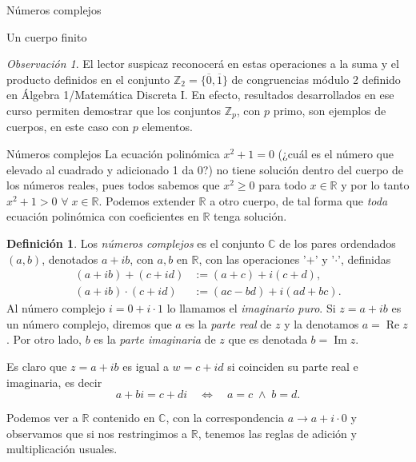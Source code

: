 \documentclass[a4paper,12pt,twoside,spanish,reqno]{amsbook}
\theoremstyle{definition}
\newtheorem{definicion}{Definici\'on}[section]
\theoremstyle{remark}
\newtheorem{obs}{Observaci\'on}[section]
\newcommand{\R}{\mathbb R}
\newcommand{\C}{\mathbb C}
\newcommand{\Z}{\mathbb Z}
\begin{document}
\begin{chapter}{Números complejos}
\begin{subsection}{Un cuerpo finito}
		\begin{obs}
			El lector suspicaz reconocerá en estas operaciones a la suma y el producto definidos en el conjunto $\Z_2=\{\overline{0},\overline{1}\}$ de congruencias módulo 2  definido en Álgebra 1/Matemática Discreta I. En efecto, resultados desarrollados en ese curso permiten demostrar que los conjuntos $\Z_p$, con $p$ primo, son ejemplos de cuerpos, en este caso con $p$ elementos.
		\end{obs}
		
	\end{subsection}
	
	
	\begin{section}{Números complejos}
		La ecuación polinómica $x^2 + 1 =0$ (¿cuál es el número que elevado  al cuadrado y adicionado 1 da 0?) no tiene solución dentro del cuerpo de los números reales,  pues todos sabemos que  $x^2 \ge 0$ para todo $x \in \R$ y por lo tanto $x^2 + 1 >0$ $\forall\; x \in \R$. Podemos extender $\R$ a otro cuerpo,  de tal forma que \textit{toda} ecuación polinómica con coeficientes en $\R$ tenga solución. 
		
		\begin{definicion} 
			Los \textit{números complejos} es el conjunto $\C$  de los pares ordendados $(a,b)$,  denotados $a+ib$, con $a, b$  en $\R$, con las operaciones '$+$' y '$\cdot$', definidas
			\begin{align}
			(a+ib)+ (c+id) &:= (a+c) + i(c+d), \label{sumacompleja} \\
			(a+ib) \cdot (c+id) &:= (ac -bd) + i(ad+bc). \label{productocomplejo}
			\end{align}
			Al número complejo $i = 0 + i\cdot 1$ lo llamamos el \textit{imaginario puro}.  Si $z= a + ib$  es un número complejo,  diremos que $a$ es la \textit{parte real} de $z$ y  la denotamos $a = \operatorname{Re} z$. Por otro lado,  $b$ es la \textit{parte  imaginaria} de $z$ que es denotada $b = \operatorname{Im} z$.
		\end{definicion}
		
		Es claro  que $z=a+ib$ es igual a $w = c+id$ si coinciden su parte real e imaginaria, es decir
		\begin{equation*}
		a+ bi = c+ di\quad \Leftrightarrow\quad a=c \;\wedge\; b = d.
		\end{equation*}
		
		Podemos  ver a $\R$ contenido en $\C$,  con la correspondencia $a \to a + i \cdot 0$ y  observamos que si  nos restringimos a $\R$, tenemos las reglas de adición y  multiplicación usuales.  
		

\end{section}
\end{chapter}
\end{document}
